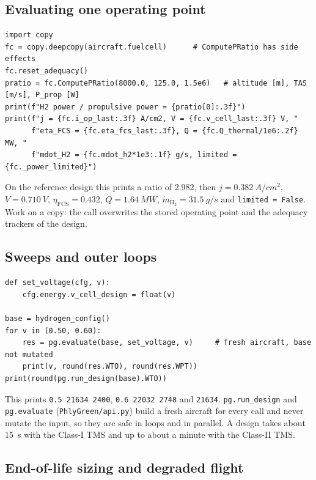 \documentclass[a4paper,11pt]{article}
\newcommand{\code}[1]{\nolinkurl{#1}}
\newcommand{\fn}[1]{\nolinkurl{#1}}
\begin{document}
\subsection{Evaluating one operating point}

\begin{lstlisting}
import copy
fc = copy.deepcopy(aircraft.fuelcell)      # ComputePRatio has side effects
fc.reset_adequacy()
pratio = fc.ComputePRatio(8000.0, 125.0, 1.5e6)   # altitude [m], TAS [m/s], P_prop [W]
print(f"H2 power / propulsive power = {pratio[0]:.3f}")
print(f"j = {fc.i_op_last:.3f} A/cm2, V = {fc.v_cell_last:.3f} V, "
      f"eta_FCS = {fc.eta_fcs_last:.3f}, Q = {fc.Q_thermal/1e6:.2f} MW, "
      f"mdot_H2 = {fc.mdot_h2*1e3:.1f} g/s, limited = {fc._power_limited}")
\end{lstlisting}
On the reference design this prints a ratio of 2.982, then $j=\SI{0.382}{A/cm^2}$,
$V=\SI{0.710}{V}$, $\eta_\mathrm{FCS}=0.432$, $\dot Q=\SI{1.64}{MW}$,
$\dot m_{\mathrm{H_2}}=\SI{31.5}{g/s}$ and \code{limited = False}. Work on a copy: the call
overwrites the stored operating point and the adequacy trackers of the design.

\subsection{Sweeps and outer loops}

\begin{lstlisting}
def set_voltage(cfg, v):
    cfg.energy.v_cell_design = float(v)

base = hydrogen_config()
for v in (0.50, 0.60):
    res = pg.evaluate(base, set_voltage, v)     # fresh aircraft, base not mutated
    print(v, round(res.WTO), round(res.WPT))
print(round(pg.run_design(base).WTO))
\end{lstlisting}
This prints \code{0.5 21634 2400}, \code{0.6 22032 2748} and \code{21634}.
\fn{pg.run_design} and \fn{pg.evaluate} (\fn{PhlyGreen/api.py}) build a fresh aircraft for
every call and never mutate the input, so they are safe in loops and in parallel. A design
takes about \SI{15}{s} with the Class-I TMS and up to about a minute with the Class-II TMS.

\subsection{End-of-life sizing and degraded flight}
\end{document}
